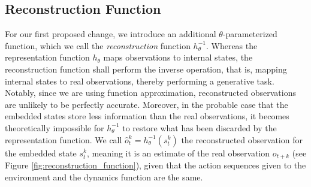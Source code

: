 \newcommand{\reconstruction}{h^{-1}}

\subsection{Reconstruction Function}
For our first proposed change, we introduce an additional $\theta$-parameterized function, which we call the \textit{reconstruction} function $\reconstruction_\theta$. Whereas the representation function $h_\theta$ maps observations to internal states, the reconstruction function shall perform the inverse operation, that is, mapping internal states to real observations, thereby performing a generative task. Notably, since we are using function approximation, reconstructed observations are unlikely to be perfectly accurate. Moreover, in the probable case that the embedded states store less information than the real observations, it becomes theoretically impossible for $\reconstruction_\theta$ to restore what has been discarded by the representation function. We call $\hat{o}^k_t = \reconstruction_\theta(s^k_t)$ the reconstructed observation for the embedded state $s^k_t$, meaning it is an estimate of the real observation $o_{t+k}$ (see Figure \ref{fig:reconstruction_function}), given that the action sequences given to the environment and the dynamics function are the same.

